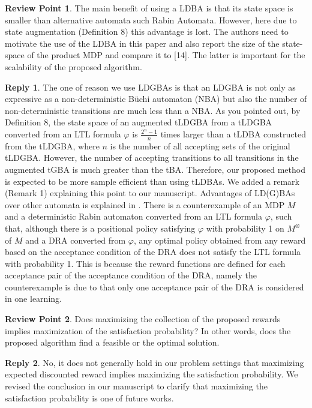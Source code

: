 \documentclass[10 pt, dvipdfmx]{article}
\theoremstyle{definition}
\newtheorem{review point}{Review Point}[section]
\newtheorem*{reply}{Reply}
\begin{document}
\begin{review point}
  The main benefit of using a LDBA is that its state space is smaller
than alternative automata such Rabin Automata. However, here due to
state augmentation (Definition 8) this advantage is lost. The authors
need to motivate the use of the LDBA in this paper and also report the
size of the state-space of the product MDP and compare it to [14]. The
latter is important for the scalability of the proposed algorithm.
\end{review point}

\begin{reply}
  The one of reason we use LDGBAs is that an LDGBA is not only as expressive as a non-deterministic B\"{u}chi automaton (NBA) but also the number of non-deterministic transitions are much less than a NBA.
 As you pointed out, by Definition 8, the state space of an augmented tLDGBA from a tLDGBA converted from an LTL formula $\varphi$ is $\frac{2^{n}-1}{n}$ times larger than a tLDBA constructed from the tLDGBA, where $n$ is the number of all accepting sets of the original tLDGBA. However, the number of accepting transitions to all transitions in the augmented tGBA is much greater than the tBA. Therefore, our proposed method is expected to be more sample efficient than using tLDBAs. We added a remark (Remark 1) explaining this point to our manuscript. Advantages of LD(G)BAs over other automata is explained in \cite{Hahn2019}. There is a counterexample of an MDP $M$ and a deterministic Rabin automaton converted from an LTL formula $\varphi$, such that, although there is a positional policy satisfying $\varphi$ with probability 1 on $M^{\otimes}$ of $M$ and a DRA converted from $\varphi$, any optimal policy obtained from any reward based on the acceptance condition of the DRA does not satisfy the LTL formula with probability 1. This is because the reward functions are defined for each acceptance pair of the acceptance condition of the DRA, namely the counterexample is due to that only one acceptance pair of the DRA is considered in one learning.
\end{reply}

\begin{review point}
  Does maximizing the collection of the proposed rewards implies
maximization of the satisfaction probability? In other words, does the
proposed algorithm find a feasible or the optimal solution.
\end{review point}

\begin{reply}
 No, it does not generally hold in our problem settings that maximizing expected discounted reward implies maximizing the satisfaction probability. We revised the conclusion in our manuscript to clarify that maximizing the satisfaction probability is one of future works.
\end{reply}
\end{document}
